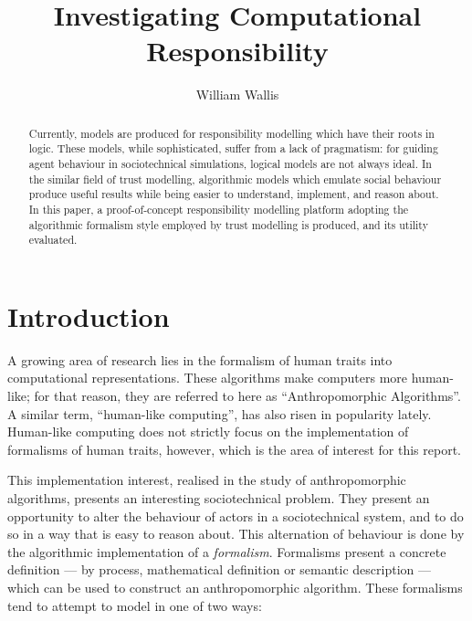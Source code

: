 



\title{Investigating Computational Responsibility}
\author{William Wallis}

\maketitle

\begin{abstract}
    Currently, models are produced for responsibility modelling which have their roots in logic. These models, while sophisticated, suffer from a lack of pragmatism: for guiding agent behaviour in sociotechnical simulations, logical models are not always ideal. In the similar field of trust modelling, algorithmic models which emulate social behaviour produce useful results while being easier to understand, implement, and reason about. In this paper, a proof-of-concept responsibility modelling platform adopting the algorithmic formalism style employed by trust modelling is produced, and its utility evaluated.
\end{abstract}

\section{Introduction}
A growing area of research lies in the formalism of human traits into computational representations. These algorithms make computers more human-like; for that reason, they are referred to here as ``Anthropomorphic Algorithms''. A similar term, ``human-like computing'', has also risen in popularity lately. Human-like computing does not strictly focus on the implementation of formalisms of human traits, however, which is the area of interest for this report.\par

This implementation interest, realised in the study of anthropomorphic algorithms, presents an interesting sociotechnical problem. They present an opportunity to alter the behaviour of actors in a sociotechnical system, and to do so in a way that is easy to reason about. This alternation of behaviour is done by the algorithmic implementation of a \emph{formalism}. Formalisms present a concrete definition --- by process, mathematical definition or semantic description --- which can be used to construct an anthropomorphic algorithm. These formalisms tend to attempt to model in one of two ways:

